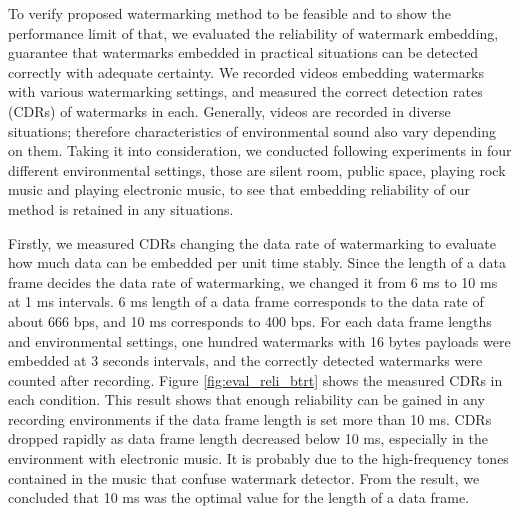 To verify proposed watermarking method to be feasible and to show the performance limit of that, we evaluated the reliability of watermark embedding, guarantee that watermarks embedded in practical situations can be detected correctly with adequate certainty.
We recorded videos embedding watermarks with various watermarking settings, and measured the correct detection rates (CDRs) of watermarks in each.
Generally, videos are recorded in diverse situations; therefore characteristics of environmental sound also vary depending on them.
Taking it into consideration, we conducted following experiments in four different environmental settings, those are silent room, public space, playing rock music and playing electronic music, to see that embedding reliability of our method is retained in any situations.

Firstly, we measured CDRs changing the data rate of watermarking to evaluate how much data can be embedded per unit time stably.
Since the length of a data frame decides the data rate of watermarking, we changed it from 6 ms to 10 ms at 1 ms intervals.
6 ms length of a data frame corresponds to the data rate of about 666 bps, and 10 ms corresponds to 400 bps.
For each data frame lengths and environmental settings, one hundred watermarks with 16 bytes payloads were embedded at 3 seconds intervals, and the correctly detected watermarks were counted after recording.
Figure \ref{fig:eval_reli_btrt} shows the measured CDRs in each condition.
This result shows that enough reliability can be gained in any recording environments if the data frame length is set more than 10 ms.
CDRs dropped rapidly as data frame length decreased below 10 ms, especially in the environment with electronic music.
It is probably due to the high-frequency tones contained in the music that confuse watermark detector.
From the result, we concluded that 10 ms was the optimal value for the length of a data frame.

